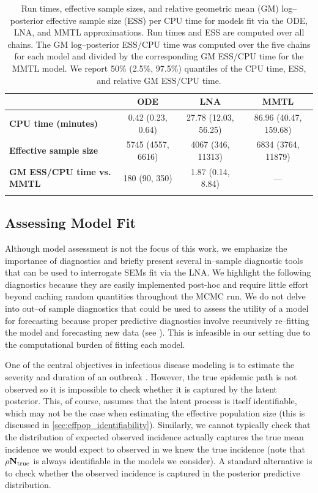  \begin{table}[htbp]
 	\caption[Computational performance of the ODE, LNA, and MMTL approximations.]{Run times, effective sample sizes, and relative geometric mean (GM) log--posterior effective sample size (ESS) per CPU time for models fit via the ODE, LNA, and MMTL approximations. Run times and ESS are computed over all chains. The GM log--posterior ESS/CPU time was computed over the five chains for each model and divided by the corresponding GM ESS/CPU time for the MMTL model. We report 50\% (2.5\%, 97.5\%) quantiles of the CPU time, ESS, and relative GM ESS/CPU time.}
 	\label{tab:lna_coverage_compstats}
 	\footnotesize
 	\centering
 	\begin{tabular}{lccc}	
 		\hline	
 		& \textbf{ODE} & \textbf{LNA} & \textbf{MMTL} \\\hline
 		\textbf{CPU time (minutes)} &  0.42 (0.23, 0.64) & 27.78  (12.03, 56.25) & 86.96 (40.47, 159.68) \\ 
 		\textbf{Effective sample size} & 5745 (4557, 6616) & 4067   (346, 11313) & 6834 (3764, 11879) \\
 		\textbf{GM ESS/CPU time vs. MMTL} & 180 (90, 350) & 1.87 (0.14, 8.84) & --- \\
 		\hline
 		&&&
 	\end{tabular} 
 \end{table}

\subsection{Assessing Model Fit}
\label{subsec:lna_model_diags}

Although model assessment is not the focus of this work, we emphasize the importance of diagnostics and briefly present several in--sample diagnostic tools that can be used to interrogate SEMs fit via the LNA. We highlight the following diagnostics because they are easily implemented post-hoc and require little effort beyond caching random quantities throughout the MCMC run. We do not delve into out--of sample diagnostics that could be used to assess the utility of a model for forecasting because proper predictive diagnostics involve recursively re--fitting the model and forecasting new data (see \cite{paul2011predictive,held2018forecasting}). This is infeasible in our setting due to the computational burden of fitting each model.

One of the central objectives in infectious disease modeling is to estimate the severity and duration of an outbreak \cite{lofgren2014opinion}. However, the true epidemic path is not observed so it is impossible to check whether it is captured by the latent posterior. This, of course, assumes that the latent process is itself identifiable, which may not be the case when estimating the effective population size (this is discussed in \ref{sec:effpop_identifiability}). Similarly, we cannot typically check that the distribution of expected observed incidence actually captures the true mean incidence we would expect to observed in we knew the true incidence (note that $ \rho\mathbf{N}_{\mathrm{true}} $ is always identifiable in the models we consider). A standard alternative is to check whether the observed incidence is captured in the posterior predictive distribution. 

